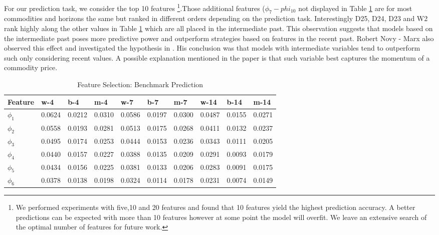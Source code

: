 For our prediction task, we consider the top 10 features \footnote{We performed experiments with five,10 and 20 features and found that 10 features yield the highest prediction accuracy. A better predictions can be expected with more than 10 features however at some point the model will overfit. We leave an extensive search of the optimal number of features for future work.}.Those additional features ($\phi_7 - phi_10$ not displayed in Table \ref{tab:feat_mod1}  are for most commodities and horizons the same but ranked in different orders depending on the prediction task. Interestingly D25, D24, D23 and W2 rank highly along the other values in Table \ref{tab:feat_mod1} which are all placed in the intermediate past. This observation suggests that models based on the intermediate past poses more predictive power and outperform strategies based on features in the recent past. Robert Novy - Marx also observed this effect and investigated the hypothesis in \cite{iuj11}. His conclusion was that models with intermediate variables tend to outperform such only considering recent values. A possible explanation mentioned in the paper is that such variable best captures the momentum of a commodity price. 




\begin{table}[H]
\centering
\begin{tabular}{ |p{2cm}|p{1cm}|p{1cm}|p{1cm}|p{1cm}|p{1cm}|p{1cm}|p{1cm}|p{1cm}|p{1cm}| }
  \hline
 Feature & w-4 & b-4 & m-4 & w-7 & b-7 & m-7 & w-14 & b-14 & m-14   \\
 \hline

 $\phi_1$ & 0.0624   & 0.0212   & 0.0310 &  0.0586  & 0.0197 & 0.0300 & 0.0487 & 0.0155 & 0.0271\\
  \hline
  $\phi_2$ & 0.0558 & 0.0193 & 0.0281 & 0.0513 & 0.0175 & 0.0268 & 0.0411 & 0.0132 & 0.0237 \\
  \hline
  $\phi_3$ & 0.0495 & 0.0174 & 0.0253 & 0.0444 & 0.0153 & 0.0236 & 0.0343 & 0.0111 & 0.0205 \\
  \hline 
  $\phi_4$ & 0.0440 & 0.0157 & 0.0227 & 0.0388 & 0.0135 & 0.0209 & 0.0291 & 0.0093 & 0.0179 \\
  \hline 
  $\phi_5$ & 0.0434 & 0.0156 & 0.0225 & 0.0381 & 0.0133 & 0.0206 & 0.0283 & 0.0091 & 0.0175 \\
  \hline
  $\phi_6$ & 0.0378 & 0.0138 & 0.0198 & 0.0324 & 0.0114 & 0.0178 & 0.0231 & 0.0074 & 0.0149 \\
  \hline
 \end{tabular}
\caption{Feature Selection: Benchmark Prediction}
\label{tab:feat_mod1}
\end{table}



